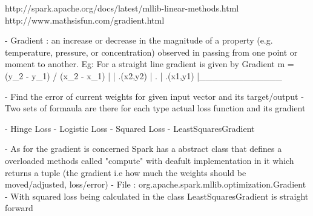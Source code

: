 
http://spark.apache.org/docs/latest/mllib-linear-methods.html
http://www.mathsisfun.com/gradient.html

- Gradient : an increase or decrease in the magnitude of a property (e.g. temperature, pressure, or concentration)
             observed in passing from one point or moment to another.
             Eg: For a straight line gradient is given by
             Gradient m = (y_2 - y_1) / (x_2 - x_1)
             |
             |     .(x2,y2)
             |    .
             |   .(x1,y1)
             |_____________



- Find the error of current weights for given input vector and its target/output
- Two sets of formaula are there for each type actual loss function and its gradient

- Hinge Loss
- Logistic Loss
- Squared Loss - LeastSquaresGradient

- As for the gradient is concerned Spark has a abstract class that defines a overloaded methods called "compute"
  with deafult implementation in it which returns a tuple (the gradient i.e how much the weights should be moved/adjusted,
  loss/error)
- File : org.apache.spark.mllib.optimization.Gradient
- With squared loss being calculated in the class LeastSquaresGradient is straight forward

